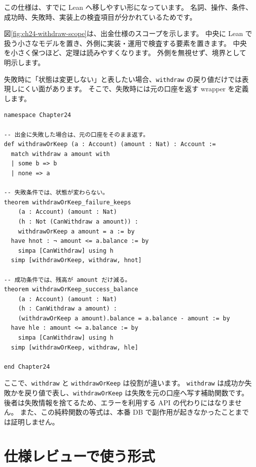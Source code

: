 この仕様は、すでに Lean へ移しやすい形になっています。
名詞、操作、条件、成功時、失敗時、実装上の検査項目が分かれているためです。


図\ref{fig:ch24-withdraw-scope}は、出金仕様のスコープを示します。
中央に Lean で扱う小さなモデルを置き、外側に実装・運用で検査する要素を置きます。
中央を小さく保つほど、定理は読みやすくなります。
外側を無視せず、境界として明示します。

失敗時に「状態は変更しない」と表したい場合、\texttt{withdraw} の戻り値だけでは表現しにくい面があります。
そこで、失敗時には元の口座を返す wrapper を定義します。

\begin{listing}[htbp]
\begin{verbatim}
namespace Chapter24

-- 出金に失敗した場合は、元の口座をそのまま返す。
def withdrawOrKeep (a : Account) (amount : Nat) : Account :=
  match withdraw a amount with
  | some b => b
  | none => a

-- 失敗条件では、状態が変わらない。
theorem withdrawOrKeep_failure_keeps
    (a : Account) (amount : Nat)
    (h : Not (CanWithdraw a amount)) :
    withdrawOrKeep a amount = a := by
  have hnot : ¬ amount <= a.balance := by
    simpa [CanWithdraw] using h
  simp [withdrawOrKeep, withdraw, hnot]

-- 成功条件では、残高が amount だけ減る。
theorem withdrawOrKeep_success_balance
    (a : Account) (amount : Nat)
    (h : CanWithdraw a amount) :
    (withdrawOrKeep a amount).balance = a.balance - amount := by
  have hle : amount <= a.balance := by
    simpa [CanWithdraw] using h
  simp [withdrawOrKeep, withdraw, hle]

end Chapter24
\end{verbatim}
\caption{\texttt{withdrawOrKeep}}
\label{lst:ch24-withdraw-or-keep}
\end{listing}

ここで、\texttt{withdraw} と \texttt{withdrawOrKeep} は役割が違います。
\texttt{withdraw} は成功か失敗かを戻り値で表し、\texttt{withdrawOrKeep} は失敗を元の口座へ写す補助関数です。
後者は失敗情報を捨てるため、エラーを利用する API の代わりにはなりません。
また、この純粋関数の等式は、本番 DB で副作用が起きなかったことまでは証明しません。

\section{仕様レビューで使う形式}

